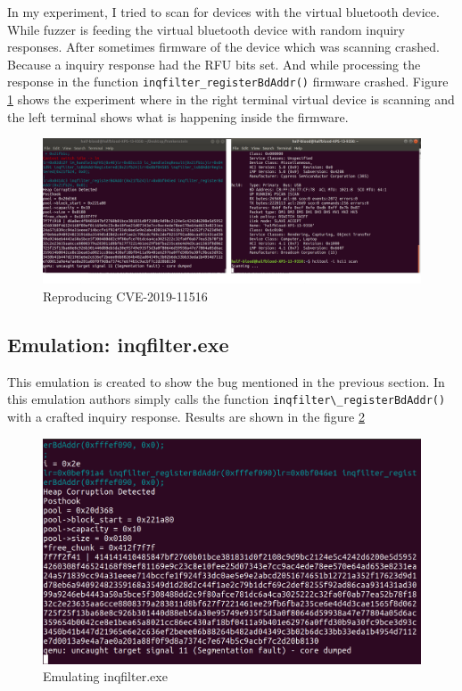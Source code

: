 \documentclass[letterpaper,11pt]{article}
\begin{document}
In my experiment, I tried to scan for devices with the virtual bluetooth device. While fuzzer is feeding the virtual bluetooth device with random inquiry responses. After sometimes firmware of the device which was scanning crashed. Because a inquiry response had the RFU bits set. And while processing the response in the function \verb|inqfilter_registerBdAddr()| firmware crashed. Figure \ref{fig:inqfilter_cve} shows the experiment where in the right terminal virtual device is scanning and the left terminal shows what is happening inside the firmware.
\begin{figure}
    \centering
    \includegraphics[width=\textwidth]{images/first-cve.png}      \caption{Reproducing CVE-2019-11516}
    \label{fig:inqfilter_cve}
\end{figure}

\subsection{Emulation: inqfilter.exe}
This emulation is created to show the bug mentioned in the previous section. In this emulation authors simply calls the function \verb|inqfilter\_registerBdAddr()| with a crafted inquiry response. Results are shown in the figure \ref{fig:inqfilter}
\begin{figure}
    \centering
    \includegraphics[width=\textwidth]{images/InqFilter.png}
    \caption{Emulating inqfilter.exe}
    \label{fig:inqfilter}
\end{figure}
\end{document}
